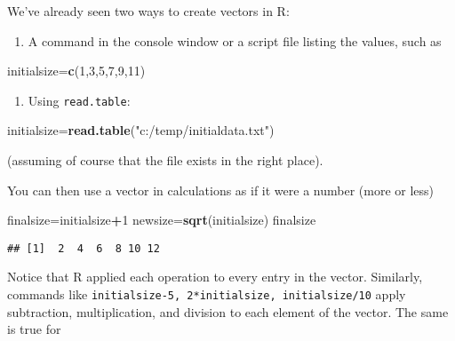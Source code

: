 \documentclass[11pt,]{article}
\newenvironment{Shaded}{\begin{snugshade}}{\end{snugshade}}
\newcommand{\KeywordTok}[1]{\textcolor[rgb]{0.13,0.29,0.53}{\textbf{#1}}}
\newcommand{\DecValTok}[1]{\textcolor[rgb]{0.00,0.00,0.81}{#1}}
\newcommand{\StringTok}[1]{\textcolor[rgb]{0.31,0.60,0.02}{#1}}
\newcommand{\OperatorTok}[1]{\textcolor[rgb]{0.81,0.36,0.00}{\textbf{#1}}}
\newcommand{\NormalTok}[1]{#1}
\providecommand{\tightlist}{%
  \setlength{\itemsep}{0pt}\setlength{\parskip}{0pt}}
\begin{document}
We've already seen two ways to create vectors in R:

\begin{enumerate}
\def\labelenumi{\arabic{enumi}.}
\tightlist
\item
  A command in the console window or a script file listing the values,
  such as
\end{enumerate}

\begin{Shaded}
\begin{Highlighting}[]
\NormalTok{initialsize=}\KeywordTok{c}\NormalTok{(}\DecValTok{1}\NormalTok{,}\DecValTok{3}\NormalTok{,}\DecValTok{5}\NormalTok{,}\DecValTok{7}\NormalTok{,}\DecValTok{9}\NormalTok{,}\DecValTok{11}\NormalTok{)}
\end{Highlighting}
\end{Shaded}

\begin{enumerate}
\def\labelenumi{\arabic{enumi}.}
\setcounter{enumi}{1}
\tightlist
\item
  Using \texttt{read.table}:
\end{enumerate}

\begin{Shaded}
\begin{Highlighting}[]
\NormalTok{initialsize=}\KeywordTok{read.table}\NormalTok{(}\StringTok{"c:/temp/initialdata.txt"}\NormalTok{)}
\end{Highlighting}
\end{Shaded}

(assuming of course that the file exists in the right place).

You can then use a vector in calculations as if it were a number (more
or less)

\begin{Shaded}
\begin{Highlighting}[]
\NormalTok{finalsize=initialsize}\OperatorTok{+}\DecValTok{1}
\NormalTok{newsize=}\KeywordTok{sqrt}\NormalTok{(initialsize)}
\NormalTok{finalsize}
\end{Highlighting}
\end{Shaded}

\begin{verbatim}
## [1]  2  4  6  8 10 12
\end{verbatim}

Notice that R applied each operation to every entry in the vector.
Similarly, commands like
\texttt{initialsize-5,\ 2*initialsize,\ initialsize/10} apply
subtraction, multiplication, and division to each element of the vector.
The same is true for
\end{document}
